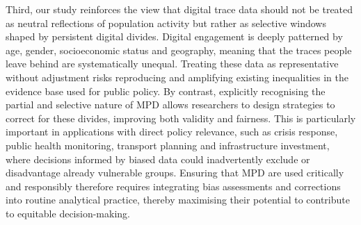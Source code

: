 \documentclass[]{rsos}%
\begin{document}
Third, our study reinforces the view that digital trace data should not
be treated as neutral reflections of population activity but rather as
selective windows shaped by persistent digital divides. Digital
engagement is deeply patterned by age, gender, socioeconomic status and
geography, meaning that the traces people leave behind are
systematically unequal. Treating these data as representative without
adjustment risks reproducing and amplifying existing inequalities in the
evidence base used for public policy. By contrast, explicitly
recognising the partial and selective nature of MPD allows researchers
to design strategies to correct for these divides, improving both
validity and fairness. This is particularly important in applications
with direct policy relevance, such as crisis response, public health
monitoring, transport planning and infrastructure investment, where
decisions informed by biased data could inadvertently exclude or
disadvantage already vulnerable groups. Ensuring that MPD are used
critically and responsibly therefore requires integrating bias
assessments and corrections into routine analytical practice, thereby
maximising their potential to contribute to equitable decision-making.
\end{document}
